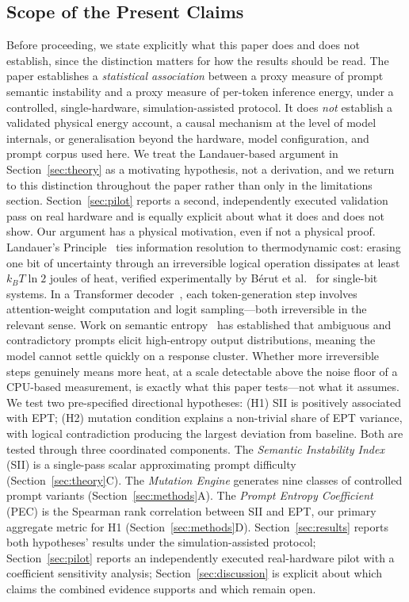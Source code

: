 \documentclass[conference]{IEEEtran}
\begin{document}
\subsection*{Scope of the Present Claims}
Before proceeding, we state explicitly what this paper does and does
not establish, since the distinction matters for how the results
should be read. The paper establishes a \emph{statistical association}
between a proxy measure of prompt semantic instability and a
proxy measure of per-token inference energy, under a controlled,
single-hardware, simulation-assisted protocol. It does \emph{not}
establish a validated physical energy account, a causal mechanism at
the level of model internals, or generalisation beyond the hardware,
model configuration, and prompt corpus used here. We treat the
Landauer-based argument in Section~\ref{sec:theory} as a motivating
hypothesis, not a derivation, and we return to this distinction
throughout the paper rather than only in the limitations section.
Section~\ref{sec:pilot} reports a second, independently executed
validation pass on real hardware and is equally explicit about what it
does and does not show.
Our argument has a physical motivation, even if not a physical proof.
Landauer's Principle~\cite{landauer1961irrev} ties information
resolution to thermodynamic cost: erasing one bit of uncertainty
through an irreversible logical operation dissipates at least
$k_B T \ln 2$ joules of heat, verified experimentally by B\'erut et
al.~\cite{berut2012experimental} for single-bit systems. In a
Transformer decoder~\cite{vaswani2017attention}, each token-generation
step involves attention-weight computation and logit sampling---both
irreversible in the relevant sense. Work on semantic
entropy~\cite{kuhn2023semantic,farquhar2024detecting} has established
that ambiguous and contradictory prompts elicit high-entropy output
distributions, meaning the model cannot settle quickly on a response
cluster. Whether more irreversible steps genuinely means more heat, at
a scale detectable above the noise floor of a CPU-based measurement,
is exactly what this paper tests---not what it assumes.
We test two pre-specified directional hypotheses: (H1) SII is
positively associated with EPT; (H2) mutation condition explains a
non-trivial share of EPT variance, with logical contradiction
producing the largest deviation from baseline. Both are tested through
three coordinated components. The \emph{Semantic Instability Index}
(SII) is a single-pass scalar approximating prompt difficulty
(Section~\ref{sec:theory}C). The \emph{Mutation Engine} generates nine
classes of controlled prompt variants (Section~\ref{sec:methods}A).
The \emph{Prompt Entropy Coefficient} (PEC) is the Spearman rank
correlation between SII and EPT, our primary aggregate metric for H1
(Section~\ref{sec:methods}D). Section~\ref{sec:results} reports both
hypotheses' results under the simulation-assisted protocol;
Section~\ref{sec:pilot} reports an independently executed real-hardware
pilot with a coefficient sensitivity analysis; Section~\ref{sec:discussion}
is explicit about which claims the combined evidence supports and
which remain open.
\end{document}
